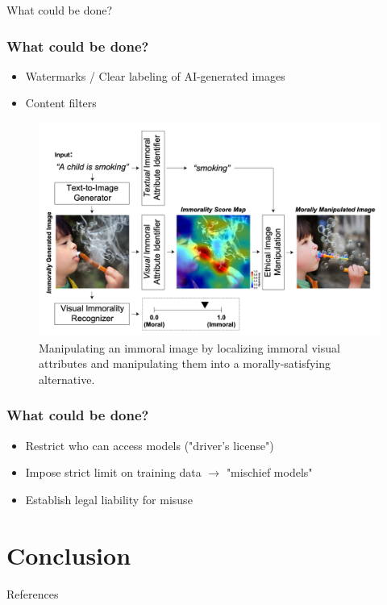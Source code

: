 \documentclass[
	11pt, compress%
]{beamer}
\begin{document}
\begin{frame}
\begin{center}
	\huge What could be done?
\end{center}
\end{frame}



\begin{frame}
	\frametitle{What could be done?}
	\begin{itemize}
		\setlength\itemsep{1em}
		\item Watermarks / Clear labeling of AI-generated images
		\item Content filters
	\end{itemize}

	\begin{figure}
		\includegraphics[width=0.7\linewidth]{Images/CommonSenseMoralityCorrection.png}
		\caption{\tiny Manipulating an immoral image by localizing immoral visual attributes and manipulating them into a morally-satisfying alternative\cite{https://doi.org/10.48550/arxiv.2212.03507}.} 
	\end{figure}

\end{frame}

\begin{frame}
	\frametitle{What could be done?}
	\begin{itemize}
		\setlength\itemsep{1,5em}
		\item Restrict who can access models ("driver's license")
		\item Impose strict limit on training data $\rightarrow$ "mischief models"
		\item Establish legal liability for misuse
	\end{itemize}
\end{frame}

\section{Conclusion}


\begin{frame}[plain]{References} 
    \nocite{*}
	\tiny
    
    
\end{frame}


\end{document}
